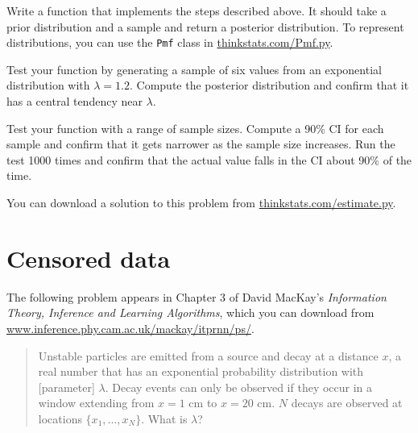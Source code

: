\documentclass[12pt]{book}
\begin{document}
\begin{ex}

Write a function that implements the steps described above.  It should
take a prior distribution and a sample and return a posterior distribution.
To represent distributions, you can use
the {\tt Pmf} class in \url{thinkstats.com/Pmf.py}.


Test your function by generating a sample of six values from an
exponential distribution with $\lambda = 1.2$.  Compute the posterior
distribution and confirm that it has a central tendency near $\lambda$.

Test your function with a range of sample sizes.  Compute a 90\% CI
for each sample and confirm that it gets narrower as
the sample size increases.  Run the test 1000 times and confirm that
the actual value falls in the CI about 90\% of the time.

You can download a solution to this problem from
\url{thinkstats.com/estimate.py}.

\end{ex}







\section{Censored data}
\label{censored}

The following problem appears in Chapter 3 of David MacKay's
{\em Information Theory, Inference and Learning
  Algorithms}, which you can download from
\url{www.inference.phy.cam.ac.uk/mackay/itprnn/ps/}.

\begin{quote}


Unstable particles are emitted from a source and decay at a distance
$x$, a real number that has an exponential probability distribution
with [parameter] $\lambda$.  Decay events can
only be observed if they occur in a window extending from $x=1$ cm to
$x=20$ cm.  $N$ decays are observed at locations $\{ x_1, ... , x_N
\}$.  What is $\lambda$?

\end{quote}
\end{document}
